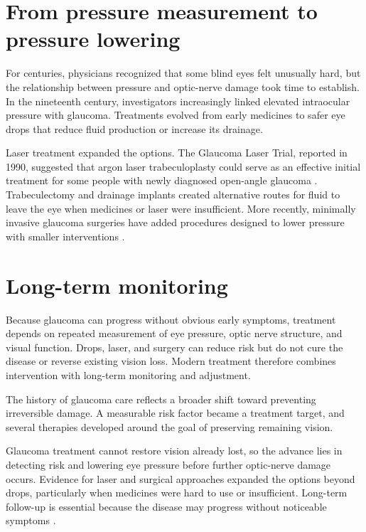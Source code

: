 \documentclass[12pt,oneside]{book}
\begin{document}
\section{From pressure measurement to pressure lowering}
For centuries, physicians recognized that some blind eyes felt unusually hard, but the relationship between pressure and optic-nerve damage took time to establish. In the nineteenth century, investigators increasingly linked elevated intraocular pressure with glaucoma. Treatments evolved from early medicines to safer eye drops that reduce fluid production or increase its drainage.

Laser treatment expanded the options. The Glaucoma Laser Trial, reported in
1990, suggested that argon laser trabeculoplasty could serve as an effective
initial treatment for some people with newly diagnosed open-angle glaucoma
\cite{neiGlaucomaLaserTrial}. Trabeculectomy and drainage implants created
alternative routes for fluid to leave the eye when medicines or laser were
insufficient. More recently, minimally invasive glaucoma surgeries have added
procedures designed to lower pressure with smaller interventions
\cite{neiGlaucomaSurgery}.

\section{Long-term monitoring}
Because glaucoma can progress without obvious early symptoms, treatment depends on repeated measurement of eye pressure, optic nerve structure, and visual function. Drops, laser, and surgery can reduce risk but do not cure the disease or reverse existing vision loss. Modern treatment therefore combines intervention with long-term monitoring and adjustment.

The history of glaucoma care reflects a broader shift toward preventing
irreversible damage. A measurable risk factor became a treatment target, and
several therapies developed around the goal of preserving remaining vision.

Glaucoma treatment cannot restore vision already lost, so the advance lies in
detecting risk and lowering eye pressure before further optic-nerve damage
occurs. Evidence for laser and surgical approaches expanded the options beyond
drops, particularly when medicines were hard to use or insufficient. Long-term
follow-up is essential because the disease may progress without noticeable
symptoms \cite{neiGlaucomaLaserTrial,neiGlaucomaSurgery}.
\end{document}
